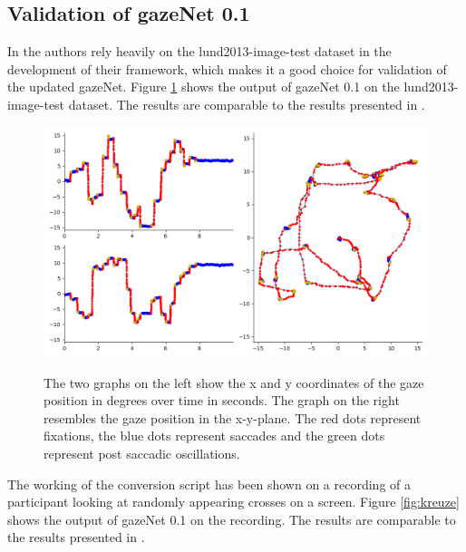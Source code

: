 \documentclass[conference]{IEEEtran}
\begin{document}
\subsection{Validation of gazeNet 0.1}
In \citet{zemblys2018gazeNet} the authors rely heavily on the lund2013-image-test dataset in the development of their framework, which makes it a good choice for validation of the updated gazeNet. Figure \ref{fig:lund2013} shows the output of gazeNet 0.1 on the lund2013-image-test dataset. The results are comparable to the results presented in \citet{zemblys2018gazeNet}. 
\begin{figure}
    \includegraphics[width=\linewidth]{TH34_img_Europe_labelled_MN}
    \label{fig:lund2013}
    \caption{The two graphs on the left show the x and y coordinates of the gaze position in degrees over time in seconds. The graph on the right resembles the gaze position in the x-y-plane. The red dots represent fixations, the blue dots represent saccades and the green dots represent post saccadic oscillations.}
\end{figure}

The working of the conversion script has been shown on a recording of a participant looking at randomly appearing crosses on a screen. Figure \ref{fig:kreuze} shows the output of gazeNet 0.1 on the recording. The results are comparable to the results presented in \citet{zemblys2018gazeNet}.
\end{document}
